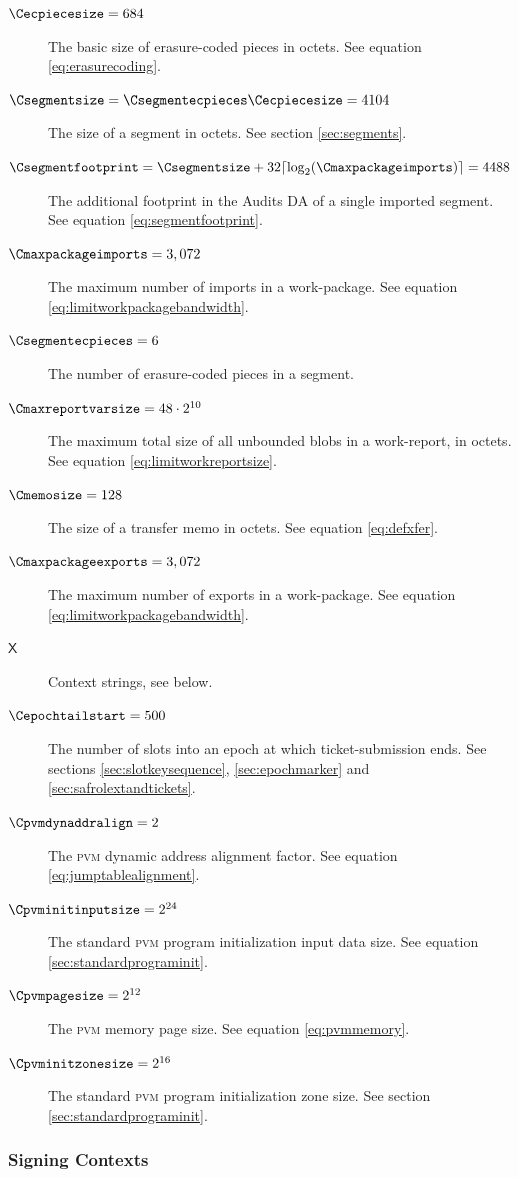\begin{description}
  \item[$\Cecpiecesize = 684$] The basic size of erasure-coded pieces in octets. See equation \ref{eq:erasurecoding}.
  \item[$\Csegmentsize = \Csegmentecpieces\Cecpiecesize = 4104$] The size of a segment in octets. See section \ref{sec:segments}.
  \item[$\Csegmentfootprint = \Csegmentsize + 32\ceil{\log_2(\Cmaxpackageimports)} = 4488$] The additional footprint in the Audits DA of a single imported segment. See equation \ref{eq:segmentfootprint}.
  \item[$\Cmaxpackageimports = 3,072$] The maximum number of imports in a work-package. See equation \ref{eq:limitworkpackagebandwidth}.
  \item[$\Csegmentecpieces = 6$] The number of erasure-coded pieces in a segment.
  \item[$\Cmaxreportvarsize = 48\cdot2^{10}$] The maximum total size of all unbounded blobs in a work-report, in octets. See equation \ref{eq:limitworkreportsize}.
  \item[$\Cmemosize = 128$] The size of a transfer memo in octets. See equation \ref{eq:defxfer}.
  \item[$\Cmaxpackageexports = 3,072$] The maximum number of exports in a work-package. See equation \ref{eq:limitworkpackagebandwidth}.
  \item[$\mathsf{X}$] Context strings, see below.
  \item[$\Cepochtailstart = 500$] The number of slots into an epoch at which ticket-submission ends. See sections \ref{sec:slotkeysequence}, \ref{sec:epochmarker} and \ref{sec:safrolextandtickets}.
  \item[$\Cpvmdynaddralign = 2$] The \textsc{pvm} dynamic address alignment factor. See equation \ref{eq:jumptablealignment}.
  \item[$\Cpvminitinputsize = 2^{24}$] The standard \textsc{pvm} program initialization input data size. See equation \ref{sec:standardprograminit}.
  \item[$\Cpvmpagesize = 2^{12}$] The \textsc{pvm} memory page size. See equation \ref{eq:pvmmemory}.
  \item[$\Cpvminitzonesize = 2^{16}$] The standard \textsc{pvm} program initialization zone size. See section \ref{sec:standardprograminit}.
\end{description}

\subsubsection{Signing Contexts}


